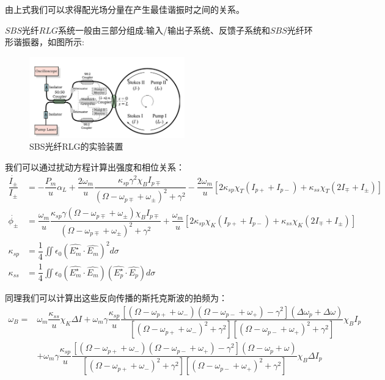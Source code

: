 \documentclass[UTF8]{ctexart}
\begin{document}
由上式我们可以求得配光场分量在产生最佳谐振时之间的关系。


$SBS$光纤$RLG$系统一般由三部分组成:输入/输出子系统、反馈子系统和$SBS$光纤环形谐振器，如图所示\cite{Luo2013BrillouinRamanCO}:
\begin{figure}[H]
	\begin{center}
		\includegraphics[width=0.6\textwidth]{4.png}
		\caption{SBS光纤RLG的实验装置}
	\end{center}
\end{figure}


我们可以通过扰动方程计算出强度和相位关系：\begin{equation}
	\begin{aligned}
		\dfrac{\dot{I_{\pm}}}{I_{\pm}}&=-\dfrac{P_{m}}{u}\alpha_{L}+\dfrac{2\omega_{m}}{u}\dfrac{\kappa_{sp}\gamma^{2}\chi_{B}I_{p\mp}}{(\Omega-\omega_{p\mp}+\omega_{\pm})^{2}+\gamma^{2}}-\dfrac{2\omega_{m}}{u}[2\kappa_{sp}\chi_{T}(I_{p+}+I_{p-})+\kappa_{ss}\chi_{T}(2I_{\mp}+I_{\pm})]\\
		\dot{\phi_{\pm}}&=\dfrac{\omega_{m}}{u}\dfrac{\kappa_{sp}\gamma(\Omega-\omega_{p\mp}+\omega_{\pm})\chi_{B}I_{p\mp}}{(\Omega-\omega_{p\mp}+\omega_{\pm})^{2}+\gamma^{2}}+\dfrac{\omega_{m}}{u}[2\kappa_{sp}\chi_{K}(I_{p+}+I_{p-})+\kappa_{ss}\chi_{K}(2I_{\mp}+I_{\pm})]\\
		\kappa_{sp}&=\dfrac{1}{4}\iint\epsilon_{0}(\hat{E_{m}^{\star}}\cdot\hat{E_{m}})^{2}d\sigma\\
		\kappa_{ss}&=\dfrac{1}{4}\iint\epsilon_{0}(\hat{E_{m}^{\star}}\cdot\hat{E_{m}})(\hat{E_{p}^{\star}}\cdot\hat{E_{p}})d\sigma
	\end{aligned}
\end{equation}


同理我们可以计算出这些反向传播的斯托克斯波的拍频为：\begin{equation}
	\begin{aligned}
		\omega_{B}=&\omega_{m}\dfrac{\kappa_{ss}}{u}\chi_{K}\Delta I+\omega_{m}\gamma\dfrac{\kappa_{sp}}{u}\dfrac{[(\Omega-\omega_{p+}+\omega_{-})(\Omega-\omega_{p-}+\omega_{+})-\gamma^{2}](\Delta \omega_{p}+\Delta\omega)}{[(\Omega-\omega_{p+}+\omega_{-})^{2}+\gamma^{2}][(\Omega-\omega_{p-}+\omega_{+})^{2}+\gamma^{2}]}\chi_{B} I_{p}\\&+\omega_{m}\gamma\dfrac{\kappa_{sp}}{u}\dfrac{[(\Omega-\omega_{p+}+\omega_{-})(\Omega-\omega_{p-}+\omega_{+})-\gamma^{2}](\Omega-\omega_{p}+\omega)}{[(\Omega-\omega_{p+}+\omega_{-})^{2}+\gamma^{2}][(\Omega-\omega_{p-}+\omega_{+})^{2}+\gamma^{2}]}\chi_{B}\Delta I_{p}
	\end{aligned}
\end{equation}
\end{document}
